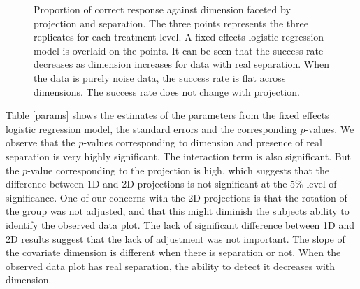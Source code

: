 \begin{figure}[ht]
   \centering
      \caption{Proportion of correct response against dimension faceted by projection and separation. The three points represents the three replicates for each treatment level. A fixed effects logistic regression model is overlaid on the points. It can be seen that the success rate decreases as dimension increases for data with real separation. When the data is purely noise data, the success rate is flat across dimensions. The success rate does not change with projection.  }
       \label{suc-rate-glm}
\end{figure}

Table \ref{params} shows the estimates of the parameters from the fixed effects logistic regression model, the standard errors and the corresponding $p$-values. We observe that the $p$-values corresponding to dimension and presence of real separation is very highly significant. The interaction term is also significant. But the $p$-value corresponding to the projection is high, which suggests that the difference between 1D and 2D projections is not significant at the 5\% level of significance. One of our concerns with the 2D projections is that the rotation of the group was not adjusted, and that this might diminish the subjects ability to identify the observed data plot. The lack of significant difference between 1D and 2D results suggest that the lack of adjustment was not important. The slope of the covariate dimension is different when there is separation or not. When the observed data plot has real separation, the ability to detect it decreases with dimension.


